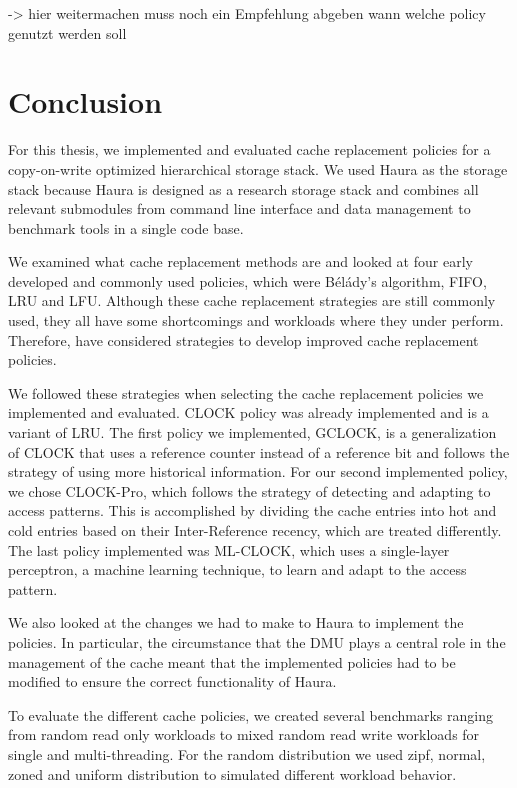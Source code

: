 \documentclass[
	12pt,
	a4paper,
	abstract,
	bibliography=totoc,
	chapterprefix,
	headings=openright,
	numbers=endperiod,
	parskip=half,
	twoside,
]{scrreprt}
\begin{document}
-> hier weitermachen muss noch ein Empfehlung abgeben wann welche policy genutzt werden soll


\chapter{Conclusion}
\label{cha:conclusion}

For this thesis, we implemented and evaluated cache replacement policies for a copy-on-write 
optimized hierarchical storage stack.
We used Haura as the storage stack because Haura is designed as a research storage stack and 
combines all relevant submodules from command line interface and data management 
to benchmark tools in a single code base.

We examined what cache replacement methods are and looked at 
four early developed and commonly used policies, which were  Bélády's algorithm, FIFO, LRU and LFU.
Although these cache replacement strategies are still commonly used, they all have some shortcomings 
and workloads where they under perform.
Therefore, have considered strategies to develop improved cache replacement policies.

We followed these strategies when selecting the cache replacement policies we implemented and evaluated.
CLOCK policy was already implemented and is a variant of LRU.
The first policy we implemented, GCLOCK, is a generalization of CLOCK that uses a reference counter 
instead of a reference bit and follows the strategy of using more historical information.
For our second implemented policy, we chose CLOCK-Pro, which follows the strategy of detecting and adapting to access patterns.
This is accomplished by dividing the cache entries into hot and cold entries based on 
their Inter-Reference recency, which are treated differently.
The last policy implemented was ML-CLOCK, which uses a single-layer perceptron, 
a machine learning technique, to learn and adapt to the access pattern.

We also looked at the changes we had to make to Haura to implement the policies.
In particular, the circumstance that the DMU plays a central role in the management of the cache 
meant that the implemented policies had to be modified to ensure the correct functionality of Haura.

To evaluate the different cache policies, we created several benchmarks ranging from 
random read only workloads to mixed random read write workloads for single and multi-threading. 
For the random distribution we used zipf, normal, zoned and uniform distribution to simulated different workload behavior.
\end{document}
